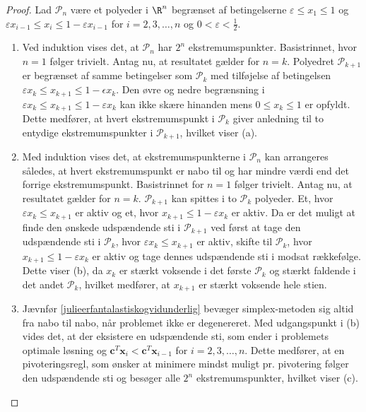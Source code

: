 \begin{proof}
%
Lad $\mathcal{P}_n$ være et polyeder i $\R^n$ begrænset af betingelserne $\varepsilon \leq x_1 \leq 1$ og $\varepsilon x_{i-1} \leq x_i \leq 1 - \varepsilon x_{i-1}$ for $i = 2, 3, \ldots, n$ og $0 < \varepsilon < \frac{1}{2}$.
%
\begin{enumerate}[label = (\alph*)]
\item Ved induktion vises det, at $\mathcal{P}_n$ har $2^n$ ekstremumspunkter. 
Basistrinnet, hvor $n=1$ følger trivielt.
Antag nu, at resultatet gælder for $n=k$.
Polyedret $\mathcal{P}_{k+1}$ er begrænset af samme betingelser som $\mathcal{P}_{k}$ med tilføjelse af betingelsen $\varepsilon x_{k} \leq x_{k+1} \leq 1 - \epsilon x_{k}$.
Den øvre og nedre begrænsning i $\varepsilon x_{k} \leq x_{k+1} \leq 1 - \varepsilon x_{k}$ kan ikke skære hinanden mens $ 0 \leq x_k \leq 1$ er opfyldt.
Dette medfører, at hvert ekstremumspunkt i $\mathcal{P}_{k}$ giver anledning til to entydige ekstremumspunkter i $\mathcal{P}_{k+1}$, hvilket viser (a).
\item Med induktion vises det, at ekstremumspunkterne i $\mathcal{P}_n$ kan arrangeres således, at hvert ekstremumspunkt er nabo til og har mindre værdi end det forrige ekstremumspunkt.
Basistrinnet for $n=1$ følger trivielt.
Antag nu, at resultatet gælder for  $n = k$.
$\mathcal{P}_{k+1}$ kan spittes i to $\mathcal{P}_{k}$ polyeder.
Et, hvor $\varepsilon x_{k} \leq x_{k+1}$ er aktiv og et, hvor $x_{k+1} \leq 1 - \varepsilon x_{k}$ er aktiv.
Da er det muligt at finde den ønskede udspændende sti i $\mathcal{P}_{k+1}$ ved først at tage den udspændende sti i $\mathcal{P}_{k}$, hvor $\varepsilon x_{k} \leq x_{k+1}$ er aktiv, skifte til $\mathcal{P}_{k}$, hvor $x_{k+1} \leq 1 - \varepsilon x_{k}$ er aktiv og tage dennes udspændende sti i modsat rækkefølge.
Dette viser (b), da $x_k$ er stærkt voksende i det første $\mathcal{P}_{k}$ og stærkt faldende i det andet $\mathcal{P}_{k}$, hvilket medfører, at $x_{k+1}$ er stærkt voksende hele stien.
\item Jævnfør \ref{julieerfantalastiskogvidunderlig} bevæger simplex-metoden sig altid fra nabo til nabo, når problemet ikke er degenereret. Med udgangspunkt i (b) vides det, at der eksistere en udspændende sti, som ender i problemets optimale løsning og $\textbf{c}^T\textbf{x}_i < \textbf{c}^T\textbf{x}_{i-1}$ for $i = 2, 3, \ldots ,n$.
Dette medfører, at en pivoteringsregl, som ønsker at minimere mindst muligt pr. pivotering følger den udspændende sti og besøger alle $2^n$ ekstremumspunkter, hvilket viser (c).
\end{enumerate}
\end{proof}
%
